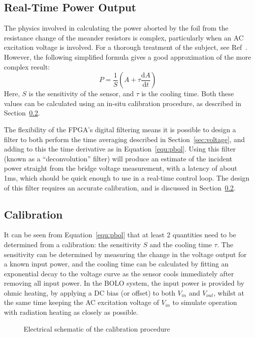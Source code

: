 \documentclass[12pt,a4paper]{article}
\begin{document}
\subsection{Real-Time Power Output}%
\label{sec:rtpower}
The physics involved in calculating the power aborted by the foil from the resistance change of the meander resistors is complex, particularly when an AC
excitation voltage is involved. For a thorough treatment of the subject, see Ref~\cite{giannone-2002}. However, the following simplified formula gives a
good approximation of the more complex result:
\begin{equation}
  \label{equ:pbol}
  P = \frac{1}{S}\left(A + \tau \frac{\mathrm{d}A}{\mathrm{d}t}\right)
\end{equation}
Here, $S$ is the sensitivity of the sensor, and $\tau$ is the cooling time. Both these values can be calculated using an in-situ calibration procedure, as
described in Section~\ref{sec:calibration}.

The flexibility of the FPGA's digital filtering means it is possible to design a filter to both perform the time averaging described in
Section~\ref{sec:voltage}, and adding to this the time derivative as in Equation~\ref{equ:pbol}. Using this filter (known as a ``deconvolution'' filter)
will produce an estimate of the incident power straight from the bridge voltage measurement, with a latency of about 1ms, which should be quick enough to
use in a real-time control loop. The design of this filter requires an accurate calibration, and is discussed in Section~\ref{sec:calibration}.

\subsection{Calibration}%
\label{sec:calibration}
It can be seen from Equation~\ref{equ:pbol} that at least 2 quantities need to be determined from a calibration: the sensitivity $S$ and the cooling
time $\tau$. The sensitivity can be determined by measuring the change in the voltage output for a known input power, and the cooling time can be
calculated by fitting an exponential decay to the voltage curve as the sensor cools immediately after removing all input power. In the BOLO system,
the input power is provided by ohmic heating, by applying a DC bias (or offset) to both $V_{in}$ and $V_{out}$, whilst at the same time keeping the
AC excitation voltage of $V_{in}$ to simulate operation with radiation heating as closely as possible.

\begin{figure}
  \centering
  \def\svgwidth{\columnwidth}
  
  \caption{Electrical schematic of the calibration procedure\label{fig:calibration}}
\end{figure}
\end{document}
